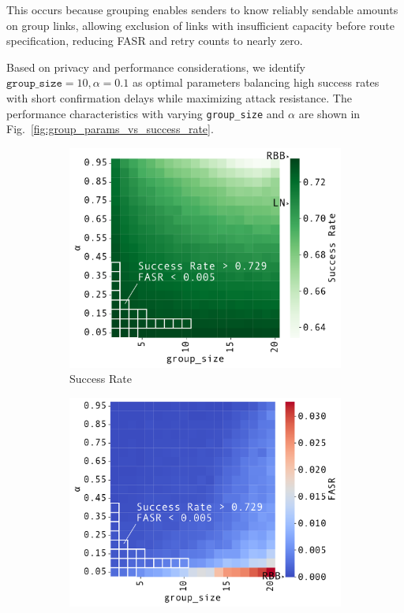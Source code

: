 \documentclass[conference]{IEEEtran}
\newcommand{\groupsize}{\texttt{group\_size}}
\begin{document}
This occurs because grouping enables senders to know reliably sendable amounts on group links, allowing exclusion of links with insufficient capacity before route specification, reducing FASR and retry counts to nearly zero.

Based on privacy and performance considerations, we identify $\groupsize=10, \alpha=0.1$ as optimal parameters balancing high success rates with short confirmation delays while maximizing attack resistance. The performance characteristics with varying \groupsize{} and $\alpha$ are shown in Fig.~\ref{fig:group_params_vs_success_rate}.

\begin{figure}[htbp]
	\centering
	\begin{subfigure}{0.248\textwidth}
		\centering
		\includegraphics[width=\linewidth]{fig/group_limit_rate_and_group_size_heatmap_success_rate}
		\caption{Success Rate}
	\end{subfigure}
	\hfill
	\begin{subfigure}{0.254\textwidth}
		\centering
		\includegraphics[width=\linewidth]{fig/group_limit_rate_and_group_size_heatmap_fail_after_send_rate}

\end{subfigure}
\end{figure}
\end{document}
